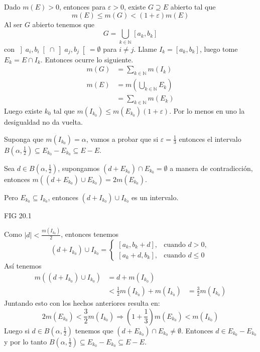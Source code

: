 \documentclass[12pt]{article}
\theoremstyle{plain}
\theoremstyle{definition}
\theoremstyle{remark}
\numberwithin{equation}{section}
\newcommand{\bN}{\mathbb{N}}        %
\renewcommand{\leq}{\leqslant}      %
\renewcommand{\:}{\colon}           %
\newcommand{\bonj}[1]{\left\lbrack#1\right\rbrack}
\newcommand{\obonj}[1]{\left\rbrack#1\right\lbrack}
\begin{document}
\begin{multicols}{2}
\begin{ptcbp}
Dado $m(E)>0$, entonces para $\varepsilon>0$, existe $G\supseteq E$ abierto tal que
$$m(E)\leq m(G)< (1+\varepsilon)m(E)$$
Al ser $G$ abierto tenemos que
$$G=\bigcup_{k\in\bN}\bonj{a_k,b_k}$$
con $\obonj{a_i,b_i}\cap\obonj{a_j,b_j}=\emptyset$ para $i\neq j$. Llame $I_k=\bonj{a_k,b_k}$, luego tome $E_k=E\cap I_k$. Entonces ocurre lo siguiente.
\begin{align*}
  m(G) &=\sum_{k\in\bN}m(I_k)\\
  m(E) &=m\left(\bigcup_{k\in\bN}E_k\right)\\
  & =\sum_{k\in\bN}m(E_k)
\end{align*}
Luego existe $k_0$ tal que $m(I_{k_0})\leq m(E_{k_0})(1+\varepsilon)$. Por lo menos en uno la desigualdad no da vuelta.\par
Suponga que $m(I_{k_0})=\alpha$, vamos a probar que si $\varepsilon=\frac{1}{3}$ entonces el intervalo $B(\alpha,\frac{1}{2})\subseteq E_{k_0}-E_{k_0}\subseteq E-E$. \par
Sea $d\in B(\alpha,\frac{1}{2})$, supongamos $(d+E_{k_0})\cap E_{k_0}=\emptyset$ a manera de contradicción, entonces
$m((d+E_{k_0})\cup E_{k_0})=2m(E_{k_0})$. \par
Pero $E_{k_0}\subseteq I_{k_0}$, entonces $(d+I_{k_0})\cup I_{k_0}$ es un intervalo.\par
FIG 20.1\par
Como $|d|<\frac{m(I_{k_0})}{2}$, entonces tenemos
$$
(d+I_{k_0})\cup I_{k_0}
=\begin{cases}
   \bonj{a_k,b_k+d}, & \mbox{cuando } d>0,\\
    \bonj{a_k+d,b_k}, & \mbox{cuando } d\leq 0
 \end{cases}
$$
Así tenemos
\begin{align*}
  m((d+I_{k_0})\cup I_{k_0}) &= d+m(I_{k_0})\\
  &< \frac{1}{2}m(I_{k_0})+m(I_{k_0})
  &= \frac{3}{2}m(I_{k_0})
\end{align*}
Juntando esto con los hechos anteriores resulta en:
$$2m(E_{k_0})<\frac{3}{2}m(I_{k_0})\Rightarrow (1+\frac{1}{3})m(E_{k_0})<m(I_{k_0})$$
Luego si $d\in B(\alpha,\frac{1}{2})$ tenemos que $(d+E_{k_0})\cap E_{k_0}\neq \emptyset$. Entonces $d\in E_{k_0}-E_{k_0}$ y por lo tanto $B(\alpha,\frac{1}{2})\subseteq E_{k_0}-E_{k_0}\subseteq E-E$.
\end{ptcbp}


\end{multicols}
\end{document}
